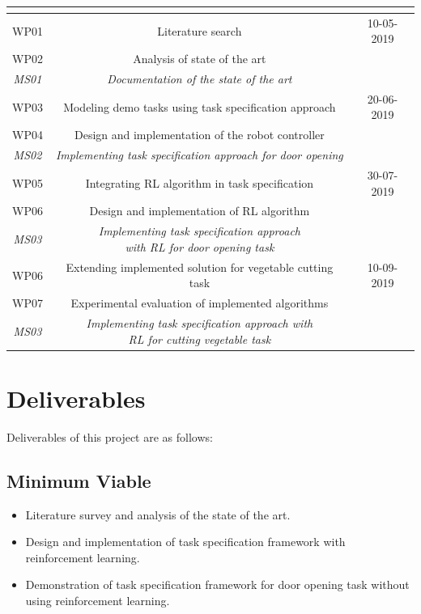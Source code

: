\documentclass[thesis]{mas_proposal}
\begin{document}
\begin{tabular}{|c|c|c|}

	\hline
	\multicolumn{2}{|c|}{\thead{Work Packages}} & \thead{Targeted date} \\
	\hline
	WP01 & Literature search & 10-05-2019 \\
	WP02 & Analysis of state of the art &  \\
	\textit{MS01} & \textit{Documentation of the state of the art} &  \\
	\hline 
	WP03 & Modeling demo tasks using task specification approach &  20-06-2019\\ 
	WP04 & Design and implementation of the robot controller &   \\
	\textit{MS02} & \textit{Implementing task specification approach for door opening} &  \\
	\hline
	WP05 & Integrating RL algorithm in task specification & 30-07-2019 \\ 
	WP06 & Design and implementation of RL algorithm &   \\
	\textit{MS03} & \makecell{\textit{Implementing task specification approach} \\ \textit{with RL for door opening task}} &  \\
	\hline
	WP06 & Extending implemented solution for vegetable cutting task & 10-09-2019 \\ 
	WP07 & Experimental evaluation of implemented algorithms &  \\
	\textit{MS03} & \makecell{\textit{Implementing task specification approach with} \\ \textit{RL for cutting vegetable task}} &  \\
	\hline
\end{tabular}



\section{Deliverables}
Deliverables of this project are as follows: 
\subsection{Minimum Viable}

\begin{itemize}
    \item Literature survey and analysis of the state of the art.
    \item Design and implementation of task specification framework with reinforcement learning.
    \item Demonstration of task specification framework for door opening task without using reinforcement learning.
\end{itemize}
\end{document}

